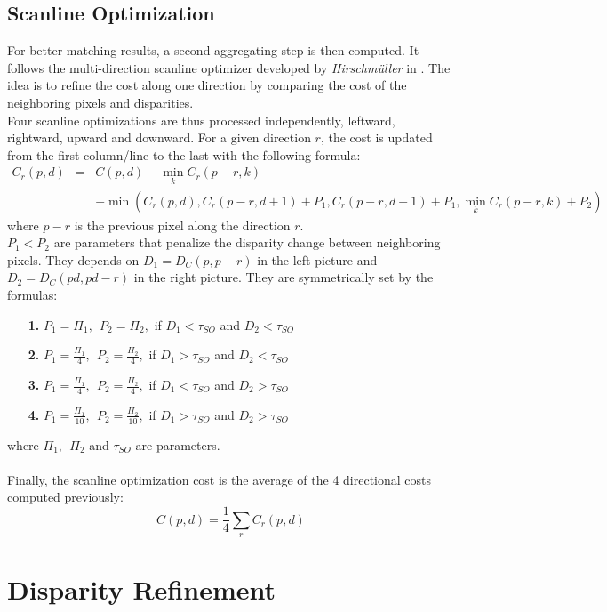 \documentclass{article}
\begin{document}
\subsection{Scanline Optimization}

For better matching results, a second aggregating step is then computed. It follows the multi-direction scanline optimizer developed by \textit{Hirschmüller} in \cite{scanlineOptim}. The idea is to refine the cost along one direction by comparing the cost of the neighboring pixels and disparities.\\
Four scanline optimizations are thus processed independently, leftward, rightward, upward and downward. For a given direction $r$, the cost is updated from the first column/line to the last with the following formula:
\begin{eqnarray*}
	C_r (p, d) &=&
	 C(p, d) - \min_k C_r(p-r, k)\\
	 && + \min\left( C_r(p, d) , C_r(p-r, d+1) + P_1, C_r(p-r, d-1) + P_1, \min_k C_r(p-r, k) + P_2\right)
\end{eqnarray*}
where $p-r$ is the previous pixel along the direction $r$.\\
$P_1 < P_2$ are parameters that penalize the disparity change between neighboring pixels. They depends on $D_1 = D_C(p, p-r)$ in the left picture and $D_2 = D_C(pd, pd-r)$ in the right picture. They are symmetrically set by the formulas:
\begin{itemize}
	\item[\textbf{1. }]$P_1 = \Pi_1, \ \ P_2 = \Pi_2,$ if $D_1 < \tau_{SO}$ and $D_2 < \tau_{SO}$
	\item[\textbf{2. }]$P_1 = \frac{\Pi_1}{4}, \ \ P_2 =\frac{\Pi_2}{4},$ if $D_1 > \tau_{SO}$ and $D_2 < \tau_{SO}$
	\item[\textbf{3. }]$P_1 = \frac{\Pi_1}{4}, \ \ P_2 =\frac{\Pi_2}{4},$ if $D_1 < \tau_{SO}$ and $D_2 > \tau_{SO}$
	\item[\textbf{4. }]$P_1 = \frac{\Pi_1}{10}, \ \ P_2 =\frac{\Pi_2}{10},$ if $D_1 > \tau_{SO}$ and $D_2 > \tau_{SO}$
\end{itemize}
where $\Pi_1, \ \ \Pi_2 $ and $\tau_{SO}$ are parameters.\\
\\
Finally, the scanline optimization cost is the average of the 4 directional costs computed previously:
\[
	C(p, d) = \frac{1}{4} \sum_r C_r(p,d)
\]

\section{Disparity Refinement}
\end{document}
